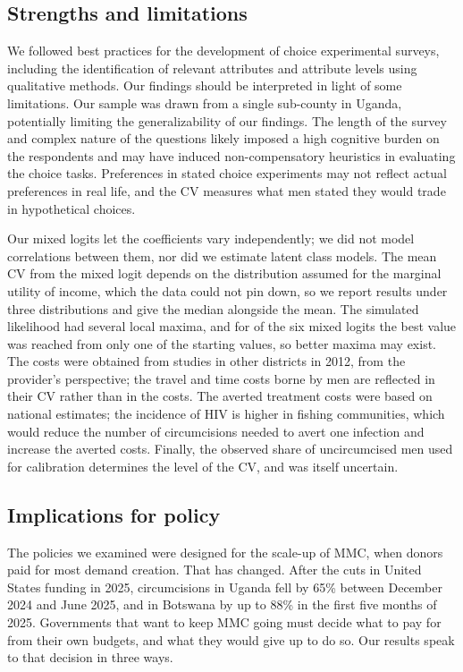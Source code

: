 \documentclass[11pt]{article}
\numberwithin{equation}{section}\numberwithin{figure}{section}\numberwithin{table}{section}
\begin{document}
\subsection{Strengths and limitations}
We followed best practices for the development of choice experimental surveys,\cite{RN69,RN76} including the identification of relevant attributes and attribute levels using qualitative methods. Our findings should be interpreted in light of some limitations. Our sample was drawn from a single sub-county in Uganda, potentially limiting the generalizability of our findings. The length of the survey and complex nature of the questions likely imposed a high cognitive burden on the respondents and may have induced non-compensatory heuristics in evaluating the choice tasks.\cite{RN280,RN278} Preferences in stated choice experiments may not reflect actual preferences in real life,\cite{RN286} and the CV measures what men stated they would trade in hypothetical choices.

Our mixed logits let the coefficients vary independently; we did not model correlations between them, nor did we estimate latent class models. The mean CV from the mixed logit depends on the distribution assumed for the marginal utility of income, which the data could not pin down, so we report results under three distributions and give the median alongside the mean. The simulated likelihood had several local maxima, and for \mmcMXsingleBest{} of the six mixed logits the best value was reached from only one of the starting values, so better maxima may exist. The costs were obtained from studies in other districts in 2012, from the provider's perspective; the travel and time costs borne by men are reflected in their CV rather than in the costs. The averted treatment costs were based on national estimates; the incidence of HIV is higher in fishing communities, which would reduce the number of circumcisions needed to avert one infection and increase the averted costs. Finally, the observed share of uncircumcised men used for calibration determines the level of the CV, and was itself uncertain.

\subsection{Implications for policy}
The policies we examined were designed for the scale-up of MMC, when donors paid for most demand creation. That has changed. After the cuts in United States funding in 2025, circumcisions in Uganda fell by 65\% between December 2024 and June 2025, and in Botswana by up to 88\% in the first five months of 2025.\cite{UNAIDS2025,Devex2025} Governments that want to keep MMC going must decide what to pay for from their own budgets, and what they would give up to do so. Our results speak to that decision in three ways.
\end{document}

